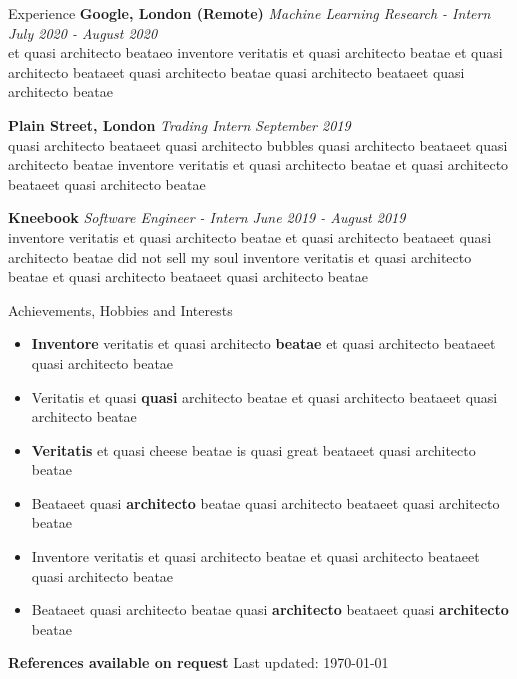 \documentclass[options]{resume}
\begin{document}
	\begin{rSection}{Experience}
		{\bf Google, London (Remote)}
		 \textit{Machine Learning Research - Intern}
		 \hfill {\em July 2020 - August 2020} 
		 \\ et quasi architecto beataeo inventore veritatis et quasi architecto beatae et quasi architecto beataeet quasi architecto beatae quasi architecto beataeet quasi architecto beatae 
		
		{\bf Plain Street, London} 
		 \textit{Trading Intern} 
		 \hfill {\em September 2019}
		\\ quasi architecto beataeet quasi architecto bubbles quasi architecto beataeet quasi architecto beatae inventore veritatis et quasi architecto beatae et quasi architecto beataeet quasi architecto beatae 
		
		{\bf Kneebook} 
		\textit{Software Engineer - Intern}
		\hfill {\em June 2019 - August 2019} 
		\\ inventore veritatis et quasi architecto beatae et quasi architecto beataeet quasi architecto beatae did not sell my soul inventore veritatis et quasi architecto beatae et quasi architecto beataeet quasi architecto beatae 
	\end{rSection}

	\begin{rSection}{Achievements, Hobbies and Interests}
		\begin{itemize}[noitemsep]
			\item \textbf{Inventore} veritatis et quasi architecto \textbf{beatae} et quasi architecto beataeet quasi architecto beatae 
			\item Veritatis et quasi \textbf{quasi} architecto beatae et quasi architecto beataeet quasi architecto beatae 
			\item \textbf{Veritatis} et quasi cheese beatae is quasi great beataeet quasi architecto beatae 
			\item Beataeet quasi \textbf{architecto} beatae quasi architecto beataeet quasi architecto beatae 
			\item Inventore veritatis et quasi architecto beatae et quasi architecto beataeet quasi architecto beatae 
			\item Beataeet quasi architecto beatae quasi \textbf{architecto} beataeet quasi \textbf{architecto} beatae 

		\end{itemize}
	\end{rSection}
{\textbf{References available on request} \hfill Last updated: \today}
\end{document}
